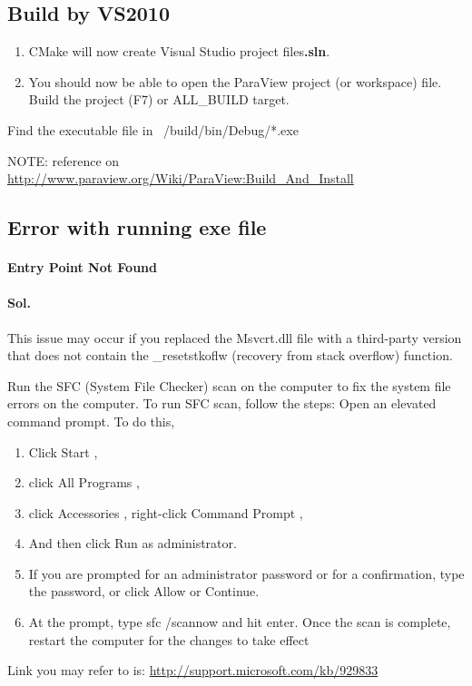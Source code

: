 \subsection{Build by VS2010}
\begin{enumerate}
\item CMake will now create Visual Studio project files{\bf *.sln}.
\item You should now be able to open the ParaView project (or workspace) file. Build the project (F7) or ALL_BUILD target. \end{enumerate}
Find the executable file in ~/build/bin/Debug/*.exe


NOTE: reference on \url{http://www.paraview.org/Wiki/ParaView:Build_And_Install}

\subsection{Error with running exe file}
\paragraph{ Entry Point Not Found }
\paragraph{Sol.} This issue may occur if you replaced the Msvcrt.dll file with a third-party version that does not contain the _resetstkoflw (recovery from stack overflow) function.
 
Run the SFC (System File Checker) scan on the computer to fix the system file errors on the computer.
To run SFC scan, follow the steps:
Open an elevated command prompt. To do this,\begin{enumerate} \item Click Start ,
\item click All Programs ,
\item click Accessories , right-click Command Prompt ,
\item And then click Run as administrator.
\item If you are prompted for an administrator password or for a confirmation, type the password, or click Allow or Continue.
\item At the prompt, type sfc /scannow and hit enter. Once the scan is complete, restart the computer for the changes to take effect
\end{enumerate}                                                                                                                 
Link you may refer to is: \url{http://support.microsoft.com/kb/929833}